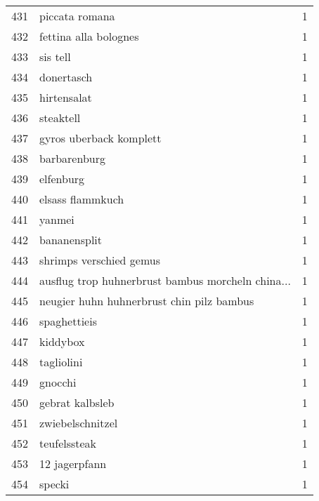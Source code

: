 \begin{tabular}{llr}
431 &                                     piccata romana &      1 \\
432 &                              fettina alla bolognes &      1 \\
433 &                                           sis tell &      1 \\
434 &                                         donertasch &      1 \\
435 &                                        hirtensalat &      1 \\
436 &                                          steaktell &      1 \\
437 &                            gyros uberback komplett &      1 \\
438 &                                       barbarenburg &      1 \\
439 &                                          elfenburg &      1 \\
440 &                                   elsass flammkuch &      1 \\
441 &                                             yanmei &      1 \\
442 &                                       bananensplit &      1 \\
443 &                            shrimps verschied gemus &      1 \\
444 &  ausflug trop huhnerbrust bambus morcheln china... &      1 \\
445 &          neugier huhn huhnerbrust chin pilz bambus &      1 \\
446 &                                       spaghettieis &      1 \\
447 &                                           kiddybox &      1 \\
448 &                                         tagliolini &      1 \\
449 &                                            gnocchi &      1 \\
450 &                                    gebrat kalbsleb &      1 \\
451 &                                   zwiebelschnitzel &      1 \\
452 &                                       teufelssteak &      1 \\
453 &                                      12 jagerpfann &      1 \\
454 &                                             specki &      1 \\

\end{tabular}
